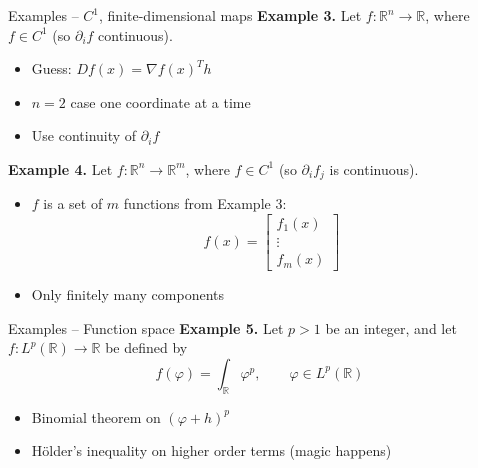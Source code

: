 \documentclass[]{beamer}
\begin{document}
	\begin{frame}{Examples -- $C^1$, finite-dimensional maps}
		\textbf{Example 3.} Let $f : \mathbb{R}^n \to \mathbb{R}$, where $f \in C^1$ (so $\partial_i f$ continuous).
		\begin{itemize}
			\item Guess: $Df(x) = \nabla f(x)^T h$
			\item $n = 2$ case one coordinate at a time
			\item Use continuity of $\partial_i f$
		\end{itemize}
		\vfill
		
		\textbf{Example 4.} Let $f: \mathbb{R}^n \to \mathbb{R}^m$, where $f \in C^1$ (so $\partial_i f_j$ is continuous). 
		\begin{itemize}
			\item $f$ is a set of $m$ functions from Example 3:
			\begin{equation*}
				f(x) = \left[\begin{matrix}
					f_1(x) \\ \vdots \\ f_m(x)
				\end{matrix}\right]
			\end{equation*}
			\item Only finitely many components
		\end{itemize}
	\end{frame}
	
	\begin{frame}{Examples -- Function space}
		\textbf{Example 5.} Let $p > 1$ be an integer, and let $f : L^p(\mathbb{R}) \to \mathbb{R}$ be defined by
		\begin{equation*}
			f(\varphi) = \int_\mathbb{R} \varphi^p, \qquad \varphi \in L^p(\mathbb{R})
		\end{equation*}
		\begin{itemize}
			\item Binomial theorem on $(\varphi + h)^p$
			\item Hölder's inequality on higher order terms (magic happens)
		\end{itemize}
	\end{frame}
	
\end{document}
